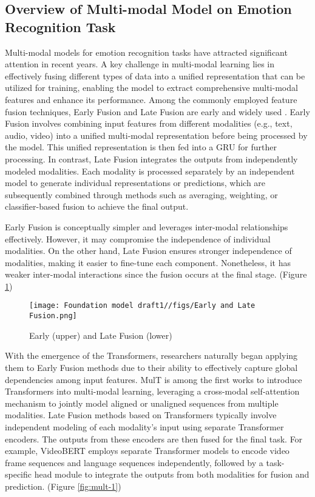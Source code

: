 \documentclass{article}
\begin{document}
\subsection{Overview of Multi-modal Model on Emotion Recognition Task}
Multi-modal models for emotion recognition tasks have attracted significant attention in recent years. A key challenge in multi-modal learning lies in effectively fusing different types of data into a unified representation that can be utilized for training, enabling the model to extract comprehensive multi-modal features and enhance its performance. Among the commonly employed feature fusion techniques, Early Fusion and Late Fusion are early and widely used \cite{Baltruaitis2017MultimodalML}. Early Fusion involves combining input features from different modalities (e.g., text, audio, video) into a unified multi-modal representation before being processed by the model. This unified representation is then fed into a GRU for further processing. In contrast, Late Fusion integrates the outputs from independently modeled modalities. Each modality is processed separately by an independent model to generate individual representations or predictions, which are subsequently combined through methods such as averaging, weighting, or classifier-based fusion to achieve the final output.

Early Fusion is conceptually simpler and leverages inter-modal relationships effectively. However, it may compromise the independence of individual modalities. On the other hand, Late Fusion ensures stronger independence of modalities, making it easier to fine-tune each component. Nonetheless, it has weaker inter-modal interactions since the fusion occurs at the final stage. (Figure \ref{fig:early-late-fusion})

\begin{figure}[ht]
    \centering
    \texttt{[image: Foundation model draft1//figs/Early and Late Fusion.png]}
    \caption{Early (upper) and Late Fusion (lower) \cite{Wu2022}}
    \label{fig:early-late-fusion}
\end{figure}

With the emergence of the Transformers, researchers naturally began applying them to Early Fusion methods due to their ability to effectively capture global dependencies among input features. MulT \cite{tsai-etal-2019-multimodal} is among the first works to introduce Transformers into multi-modal learning, leveraging a cross-modal self-attention mechanism to jointly model aligned or unaligned sequences from multiple modalities. Late Fusion methods based on Transformers typically involve independent modeling of each modality's input using separate Transformer encoders. The outputs from these encoders are then fused for the final task. For example, VideoBERT \cite{Sun2019VideoBERT} employs separate Transformer models to encode video frame sequences and language sequences independently, followed by a task-specific head module to integrate the outputs from both modalities for fusion and prediction. (Figure \ref{fig:mult-1})
\end{document}
